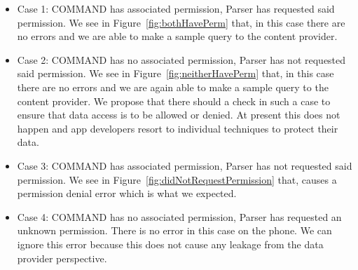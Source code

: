 \begin{itemize}
	\item Case 1: COMMAND has associated permission, Parser has requested said permission. We see in Figure~\ref{fig:bothHavePerm} that, in this case there are no errors and we are able to make a sample query to the content provider.
	\item Case 2: COMMAND has no associated permission, Parser has not requested said permission. We see in Figure~\ref{fig:neitherHavePerm} that, in this case there are no errors and we are again able to make a sample query to the content provider. We propose that there should a check in such a case to ensure that data access is to be allowed or denied. At present this does not happen and app developers resort to individual techniques to protect their data.
	\item Case 3: COMMAND has associated permission, Parser has not requested said permission. We see in Figure~\ref{fig:didNotRequestPermission} that, causes a permission denial error which is what we expected.
	\item Case 4: COMMAND has no associated permission, Parser has requested an unknown permission. There is no error in this case on the phone. We can ignore this error because this does not cause any leakage from the data provider perspective.
\end{itemize}

